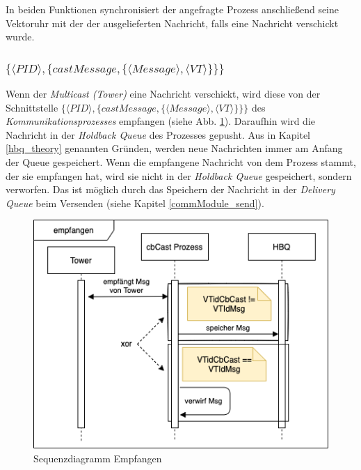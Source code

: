 In beiden Funktionen synchronisiert der angefragte Prozess anschließend seine Vektoruhr mit der der ausgelieferten Nachricht, falls eine Nachricht verschickt wurde.

\subsubsection{$\{\langle PID \rangle,\{castMessage,\{\langle Message \rangle, \langle VT \rangle\}\}\}$}

Wenn der \textit{Multicast (Tower)} eine Nachricht verschickt, wird diese von der Schnittstelle $\{\langle PID \rangle,\{castMessage,\{\langle Message \rangle, \langle VT \rangle\}\}\}$ des \textit{Kommunikationsprozesses} empfangen (siehe Abb. \ref{fig:sequence_cbCast_cbcast}). Daraufhin wird die Nachricht in der \textit{Holdback Queue} des Prozesses gepusht. Aus in  Kapitel \ref{hbq_theory} genannten Gründen, werden neue Nachrichten immer am Anfang der Queue gespeichert. Wenn die empfangene Nachricht von dem Prozess stammt, der sie empfangen hat, wird sie nicht in der \textit{Holdback Queue} gespeichert, sondern verworfen. Das ist möglich durch das Speichern der Nachricht in der \textit{Delivery Queue} beim Versenden (siehe Kapitel \ref{commModule_send}).

\begin{figure}[htbp]
\begin{center}
\includegraphics[scale=0.5]{Latex/Bilder/Sequenz_empfangen.png}
\caption{\label{fig:sequence_cbCast_cbcast} Sequenzdiagramm Empfangen}
\end{center}
\end{figure}

